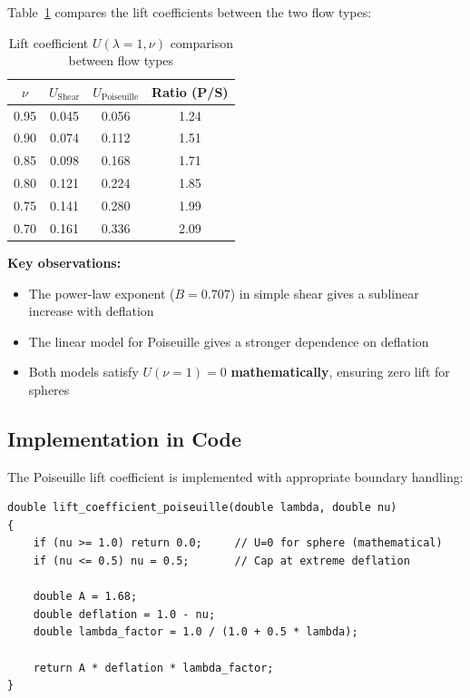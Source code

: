 \documentclass{article}
\begin{document}
Table~\ref{tab:lift_comparison_flow} compares the lift coefficients between the two flow types:

\begin{table}[H]
\centering
\caption{Lift coefficient $U(\lambda=1, \nu)$ comparison between flow types}
\label{tab:lift_comparison_flow}
\begin{tabular}{cccc}
\toprule
$\nu$ & $U_{\text{Shear}}$ & $U_{\text{Poiseuille}}$ & Ratio (P/S) \\
\midrule
0.95 & 0.045 & 0.056 & 1.24 \\
0.90 & 0.074 & 0.112 & 1.51 \\
0.85 & 0.098 & 0.168 & 1.71 \\
0.80 & 0.121 & 0.224 & 1.85 \\
0.75 & 0.141 & 0.280 & 1.99 \\
0.70 & 0.161 & 0.336 & 2.09 \\
\bottomrule
\end{tabular}
\end{table}

\textbf{Key observations:}
\begin{itemize}
    \item The power-law exponent ($B = 0.707$) in simple shear gives a sublinear increase with deflation
    \item The linear model for Poiseuille gives a stronger dependence on deflation
    \item Both models satisfy $U(\nu=1) = 0$ \textbf{mathematically}, ensuring zero lift for spheres
\end{itemize}

\subsection{Implementation in Code}

The Poiseuille lift coefficient is implemented with appropriate boundary handling:

\begin{verbatim}
double lift_coefficient_poiseuille(double lambda, double nu)
{
    if (nu >= 1.0) return 0.0;     // U=0 for sphere (mathematical)
    if (nu <= 0.5) nu = 0.5;       // Cap at extreme deflation
    
    double A = 1.68;
    double deflation = 1.0 - nu;
    double lambda_factor = 1.0 / (1.0 + 0.5 * lambda);
    
    return A * deflation * lambda_factor;
}
\end{verbatim}
\end{document}
